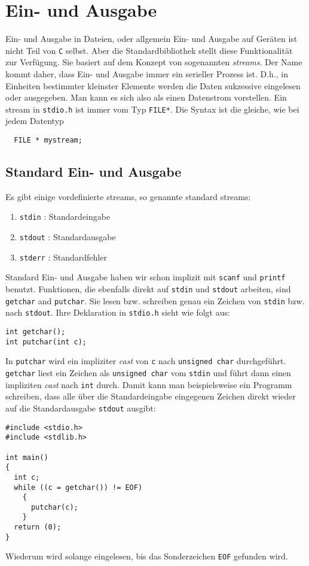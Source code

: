 \section{Ein- und Ausgabe}\label{sec:ein_ausgabe}

Ein- und Ausgabe in Dateien, oder allgemein Ein- und Ausgabe auf Geräten ist nicht Teil von \texttt{C} selbst.
Aber die Standardbibliothek stellt diese Funktionalität zur Verfügung.
Sie basiert auf dem Konzept von sogenannten \emph{streams}.
Der Name kommt daher, dass Ein- und Ausgabe immer ein serieller Prozess ist.
D.h., in Einheiten bestimmter kleinster Elemente werden die Daten sukzessive eingelesen oder ausgegeben.
Man kann es sich also als einen Datenstrom vorstellen.
Ein stream in \verb|stdio.h| ist immer vom Typ \verb|FILE*|.
Die Syntax ist die gleiche, wie bei jedem Datentyp
\begin{lstlisting}
  FILE * mystream;
\end{lstlisting}

\subsection{Standard Ein- und Ausgabe}

Es gibt einige vordefinierte streams, so genannte standard streams:
\begin{enumerate}
\item \verb|stdin| : Standardeingabe 
\item \texttt{stdout} : Standardausgabe 
\item \texttt{stderr} : Standardfehler 
\end{enumerate} 
Standard Ein- und Ausgabe haben wir schon implizit mit \texttt{scanf} und \texttt{printf} benutzt.
Funktionen, die ebenfalls direkt auf \verb|stdin| und \texttt{stdout} arbeiten, sind \verb|getchar| and \verb|putchar|.
Sie lesen bzw. schreiben genau ein Zeichen von \verb|stdin| bzw. nach \texttt{stdout}.
Ihre Deklaration in \verb|stdio.h| sieht wie folgt aus:
\begin{lstlisting}
int getchar();
int putchar(int c);
\end{lstlisting}
In \verb|putchar| wird ein impliziter \emph{cast} von \verb|c| nach \verb|unsigned char| durchgeführt.
\verb|getchar| liest ein Zeichen als \verb|unsigned char| vom \verb|stdin| und führt dann einen impliziten \emph{cast} nach \verb|int| durch.
Damit kann man beispielsweise ein Programm schreiben, dass alle über die Standardeingabe eingegenen Zeichen direkt wieder auf die Standardausgabe \texttt{stdout} ausgibt:
\begin{lstlisting}
#include <stdio.h>
#include <stdlib.h>

int main()
{
  int c;
  while ((c = getchar()) != EOF)
    {
      putchar(c);
    }
  return (0);
}
\end{lstlisting}
Wiederum wird solange eingelesen, bis das Sonderzeichen \verb|EOF| gefunden wird.

